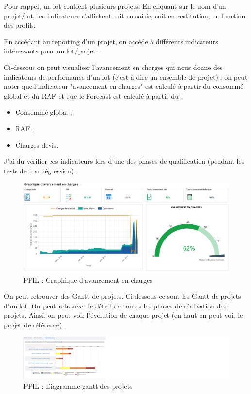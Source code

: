 Pour rappel, un lot contient plusieurs projets. En cliquant sur le nom d’un projet/lot, les indicateurs s'affichent soit en saisie, soit en restitution, en fonction des profils. 

En accédant au reporting d'un projet, on accède à différents indicateurs intéressants pour un lot/projet : 

Ci-dessous on peut visualiser l'avancement en charges qui nous donne des indicateurs de performance d'un lot (c'est à dire un ensemble de projet) : on peut noter que l'indicateur "avancement en charges" est calculé à partir du consommé global et du RAF et que le Forecast est calculé à partir du : 
\begin{itemize}
    \item Consommé global ;
    \item RAF ;
    \item Charges devis.
\end{itemize}
J'ai du vérifier ces indicateurs lors d'une des phases de qualification (pendant les tests de non régression).
\begin{figure}[!h]
\centering
\includegraphics[width=1\textwidth]{images/PPIL-avancement.png}
\caption{PPIL : Graphique d'avancement en charges}
\end{figure}

On peut retrouver des Gantt de projets. Ci-dessous ce sont les Gantt de projets d'un lot. On peut retrouver le détail de toutes les phases de réalisation des projets. Ainsi, on peut voir l'évolution de chaque projet (en haut on peut voir le projet de référence).

\begin{figure}[!h]
\centering
\includegraphics[width=2.5\textwidth]{images/PPIL-Gantt.png}
\caption{PPIL : Diagramme gantt des projets}
\end{figure}

